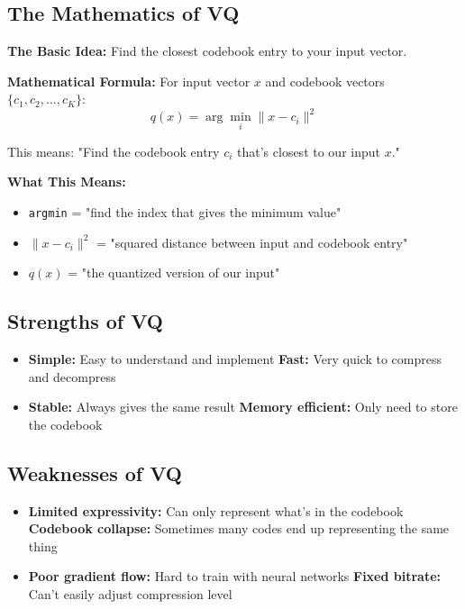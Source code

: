 \documentclass[12pt]{article}
\begin{document}
\subsection{The Mathematics of VQ}

\textbf{The Basic Idea:} Find the closest codebook entry to your input vector.

\textbf{Mathematical Formula:} For input vector $x$ and codebook vectors $\{c_1, c_2, ..., c_K\}$:
$$q(x) = \arg\min_{i} \|x - c_i\|^2$$

This means: "Find the codebook entry $c_i$ that's closest to our input $x$."

\textbf{What This Means:}
\begin{itemize}
    \item \texttt{argmin} = "find the index that gives the minimum value"
    \item $\|x - c_i\|^2$ = "squared distance between input and codebook entry"
    \item $q(x)$ = "the quantized version of our input"
\end{itemize}

\subsection{Strengths of VQ}

\begin{itemize}
    \item \textbf{Simple:} Easy to understand and implement
    \textbf{Fast:} Very quick to compress and decompress
    \item \textbf{Stable:} Always gives the same result
    \textbf{Memory efficient:} Only need to store the codebook
\end{itemize}

\subsection{Weaknesses of VQ}

\begin{itemize}
    \item \textbf{Limited expressivity:} Can only represent what's in the codebook
    \textbf{Codebook collapse:} Sometimes many codes end up representing the same thing
    \item \textbf{Poor gradient flow:} Hard to train with neural networks
    \textbf{Fixed bitrate:} Can't easily adjust compression level
\end{itemize}
\end{document}
